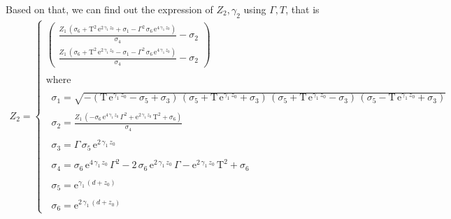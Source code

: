 \documentclass{article}
\begin{document}
Based on that, we can find out the expression of $Z_2,\gamma_2$ using $\Gamma,T$, that is
\begin{align*}
    Z_2 = \left\{\begin{array}{l}
        \left(\begin{array}{c}
        \frac{Z_1 \,{\left(\sigma_6 +{\mathrm{T}}^2 \,{\mathrm{e}}^{2\,\gamma_1 \,z_0 } +\sigma_1 -\Gamma^2 \,\sigma_6 \,{\mathrm{e}}^{4\,\gamma_1 \,z_0 } \right)}}{\sigma_4 }-\sigma_2 \\
        \frac{Z_1 \,{\left(\sigma_6 +{\mathrm{T}}^2 \,{\mathrm{e}}^{2\,\gamma_1 \,z_0 } -\sigma_1 -\Gamma^2 \,\sigma_6 \,{\mathrm{e}}^{4\,\gamma_1 \,z_0 } \right)}}{\sigma_4 }-\sigma_2 
        \end{array}\right)\\
        \mathrm{}\\
        \textrm{where}\\
        \mathrm{}\\
        \;\;\sigma_1 =\sqrt{-{\left(\mathrm{T}\,{\mathrm{e}}^{\gamma_1 \,z_0 } -\sigma_5 +\sigma_3 \right)}\,{\left(\sigma_5 +\mathrm{T}\,{\mathrm{e}}^{\gamma_1 \,z_0 } +\sigma_3 \right)}\,{\left(\sigma_5 +\mathrm{T}\,{\mathrm{e}}^{\gamma_1 \,z_0 } -\sigma_3 \right)}\,{\left(\sigma_5 -\mathrm{T}\,{\mathrm{e}}^{\gamma_1 \,z_0 } +\sigma_3 \right)}}\\
        \mathrm{}\\
        \;\;\sigma_2 =\frac{Z_1 \,{\left(-\sigma_6 \,{\mathrm{e}}^{4\,\gamma_1 \,z_0 } \,\Gamma^2 +{\mathrm{e}}^{2\,\gamma_1 \,z_0 } \,{\mathrm{T}}^2 +\sigma_6 \right)}}{\sigma_4 }\\
        \mathrm{}\\
        \;\;\sigma_3 =\Gamma \,\sigma_5 \,{\mathrm{e}}^{2\,\gamma_1 \,z_0 } \\
        \mathrm{}\\
        \;\;\sigma_4 =\sigma_6 \,{\mathrm{e}}^{4\,\gamma_1 \,z_0 } \,\Gamma^2 -2\,\sigma_6 \,{\mathrm{e}}^{2\,\gamma_1 \,z_0 } \,\Gamma -{\mathrm{e}}^{2\,\gamma_1 \,z_0 } \,{\mathrm{T}}^2 +\sigma_6 \\
        \mathrm{}\\
        \;\;\sigma_5 ={\mathrm{e}}^{\gamma_1 \,{\left(d+z_0 \right)}} \\
        \mathrm{}\\
        \;\;\sigma_6 ={\mathrm{e}}^{2\,\gamma_1 \,{\left(d+z_0 \right)}} 
        \end{array}\right.\\
\end{align*}
\end{document}

